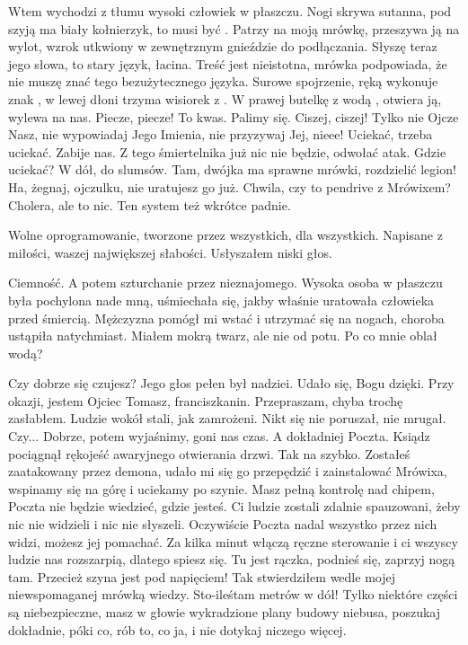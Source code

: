 Wtem wychodzi z tłumu wysoki człowiek w płaszczu.
Nogi skrywa sutanna, pod szyją ma biały kołnierzyk, to musi być \censor{}.
Patrzy na moją mrówkę, przeszywa ją na wylot, wzrok utkwiony w zewnętrznym gnieździe do podłączania.
Słyszę teraz jego słowa, to stary język, łacina. Treść jest nieistotna, mrówka podpowiada, że nie muszę znać tego bezużytecznego języka.
Surowe spojrzenie, ręką wykonuje znak \censor{}, w lewej dłoni trzyma wisiorek z \censor{}.
W prawej butelkę z wodą \censor{}, otwiera ją, wylewa na nas.
Piecze, piecze! To kwas. Palimy się. 
Ciszej, ciszej! Tylko nie Ojcze Nasz, nie wypowiadaj Jego Imienia, nie przyzywaj Jej, nieee!
Uciekać, trzeba uciekać. Zabije nas. Z tego śmiertelnika już nic nie będzie, odwołać atak.
Gdzie uciekać? W dół, do slumsów. Tam, dwójka ma sprawne mrówki, rozdzielić legion!
Ha, żegnaj, ojczulku, nie uratujesz go już. Chwila, czy to pendrive z Mrówixem? Cholera, ale to nic. Ten system też wkrótce padnie.

\begin{dialogue}
\ds{} Wolne oprogramowanie, tworzone przez wszystkich, dla wszystkich. Napisane z miłości, waszej największej słabości. \dm{} Usłyszałem niski głos.
\end{dialogue}

Ciemność. A potem szturchanie przez nieznajomego.
Wysoka osoba w płaszczu była pochylona nade mną, uśmiechała się, jakby właśnie uratowała człowieka przed śmiercią.
Mężczyzna pomógł mi wstać i utrzymać się na nogach, choroba ustąpiła natychmiast.
Miałem mokrą twarz, ale nie od potu. Po co mnie oblał wodą?

\begin{dialogue}
\ds{} Czy dobrze się czujesz? \dm{} Jego głos pełen był nadziei. \dm{} Udało się, Bogu dzięki. Przy okazji, jestem Ojciec Tomasz, franciszkanin.
\ds{} Przepraszam, chyba trochę zasłabłem. \dm{} Ludzie wokół stali, jak zamrożeni. Nikt się nie poruszał, nie mrugał. \dm{}
Czy... 
\ds{} Dobrze, potem wyjaśnimy, goni nas czas. A dokładniej Poczta. \dm{} Ksiądz pociągnął rękojeść awaryjnego otwierania drzwi.
\dm{} Tak na szybko. Zostałeś zaatakowany przez demona, udało mi się go przepędzić i zainstalować Mrówixa, wspinamy się na górę i uciekamy po szynie.
Masz pełną kontrolę nad chipem, Poczta nie będzie wiedzieć, gdzie jesteś.
Ci ludzie zostali zdalnie spauzowani, żeby nic nie widzieli i nic nie słyszeli. Oczywiście Poczta nadal wszystko przez nich widzi, możesz jej pomachać.
Za kilka minut włączą ręczne sterowanie i ci wszyscy ludzie nas rozszarpią, dlatego spiesz się. Tu jest rączka, podnieś się, zaprzyj nogą tam.
\ds{} Przecież szyna jest pod napięciem! \dm{} Tak stwierdziłem wedle mojej niewspomaganej mrówką wiedzy. \dm{} Sto-ileśtam metrów w dół!
\ds{} Tylko niektóre części są niebezpieczne, masz w głowie wykradzione plany budowy niebusa, poszukaj dokładnie, póki co, rób to, co ja, i nie dotykaj niczego więcej.
\end{dialogue}

